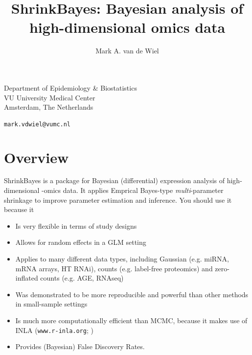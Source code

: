 \documentclass[11pt]{article}
\newcommand{\para}{\bigskip\noindent}
\begin{document}

\title{\bf ShrinkBayes: Bayesian analysis of high-dimensional omics data}

\author{Mark A. van de Wiel}

\maketitle

\begin{center}
Department of Epidemiology \& Biostatistics\\
VU University Medical Center\\
Amsterdam, The Netherlands
\end{center}

\begin{center}

{\tt mark.vdwiel@vumc.nl}
\end{center}


\tableofcontents

\section{Overview}

\para
ShrinkBayes is a package for Bayesian
(differential) expression analysis of high-dimensional -omics
data. It applies Emprical Bayes-type \emph{multi}-parameter
shrinkage to improve parameter estimation and inference.
You should use it because it

\begin{itemize}
\item Is very flexible in terms of study designs
\item Allows for random effects in a GLM setting
\item Applies to many different data types, including
Gaussian (e.g. miRNA, mRNA arrays, HT RNAi), counts (e.g.
label-free proteomics) and zero-inflated counts (e.g. AGE,
RNAseq)
\item Was demonstrated to be more reproducible and powerful than other methods in small-sample settings
    \citep{WielShrinkSeq,WielHTRNAi}
\item Is much more computationally efficient than MCMC, because it makes use of
INLA ({\tt www.r-inla.org}; \cite[]{Rue2009})
\item Provides (Bayesian) False Discovery Rates.
\end{itemize}
\end{document}
